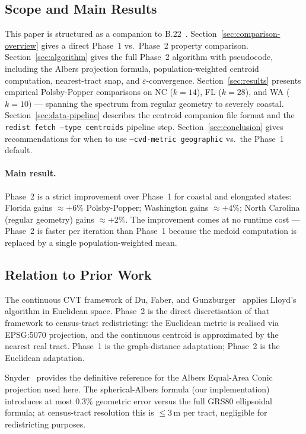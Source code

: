 \subsection{Scope and Main Results}

This paper is structured as a companion to B.22~\citep{dellaLibera2026cvd}.
Section~\ref{sec:comparison-overview} gives a direct Phase~1 vs.\ Phase~2
property comparison.
Section~\ref{sec:algorithm} gives the full Phase~2 algorithm with pseudocode,
including the Albers projection formula, population-weighted centroid computation,
nearest-tract snap, and $\varepsilon$-convergence.
Section~\ref{sec:results} presents empirical Polsby-Popper comparisons on
NC ($k=14$), FL ($k=28$), and WA ($k=10$) --- spanning the spectrum from
regular geometry to severely coastal.
Section~\ref{sec:data-pipeline} describes the centroid companion file format
and the \texttt{redist fetch --type centroids} pipeline step.
Section~\ref{sec:conclusion} gives recommendations for when to use
\texttt{--cvd-metric geographic} vs.\ the Phase~1 default.

\paragraph{Main result.}
Phase~2 \cvdgeo{} is a strict improvement over Phase~1 \cvd{} for coastal and
elongated states: Florida gains $\approx +6\%$ Polsby-Popper; Washington gains
$\approx +4\%$; North Carolina (regular geometry) gains $\approx +2\%$.
The improvement comes at no runtime cost --- Phase~2 is faster per iteration
than Phase~1 because the medoid computation is replaced by a single
population-weighted mean.

\subsection{Relation to Prior Work}

The continuous CVT framework of Du, Faber, and Gunzburger~\citeyear{du1999}
applies Lloyd's algorithm in Euclidean space.
Phase~2 \cvdgeo{} is the direct discretisation of that framework to
census-tract redistricting: the Euclidean metric is realised via EPSG:5070
projection, and the continuous centroid is approximated by the nearest real tract.
Phase~1 \cvd{} is the graph-distance adaptation; Phase~2 \cvdgeo{} is the
Euclidean adaptation.

Snyder~\citeyear{snyder1987} provides the definitive reference for the Albers
Equal-Area Conic projection used here.
The spherical-Albers formula (our implementation) introduces at most 0.3\%
geometric error versus the full GRS80 ellipsoidal formula; at census-tract
resolution this is $\le 3$\,m per tract, negligible for redistricting purposes.
